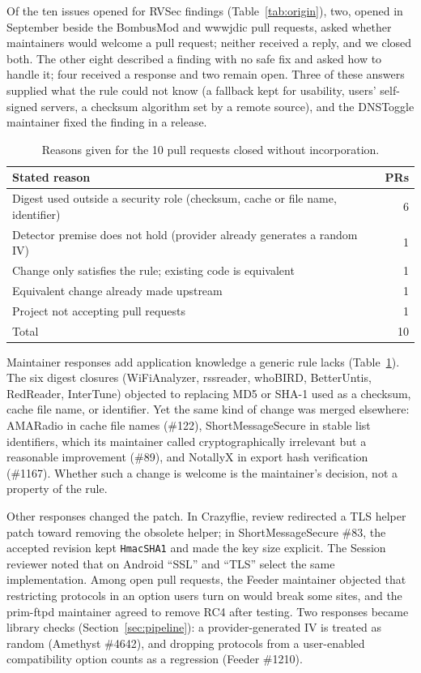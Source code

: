 \documentclass[conference]{IEEEtran}
\begin{document}
Of the ten issues opened for RVSec findings (Table~\ref{tab:origin}), two,
opened in September beside the BombusMod and wwwjdic pull requests, asked whether maintainers would
welcome a pull request; neither received a reply, and we closed both. The other
eight described a finding with no safe fix and asked how to handle it; four
received a response and two remain open. Three of these answers supplied what
the rule could not know (a fallback kept for usability, users' self-signed
servers, a checksum algorithm set by a remote source), and the DNSToggle
maintainer fixed the finding in a release.

\begin{table}[H]
\centering
\caption{Reasons given for the 10 pull requests closed without
incorporation.}
\label{tab:closures}
\footnotesize
\begin{tabular}{p{5.8cm}r}
\toprule
Stated reason & PRs \\
\midrule
Digest used outside a security role (checksum, cache or file name,
identifier) & 6 \\
Detector premise does not hold (provider already generates a random IV) & 1 \\
Change only satisfies the rule; existing code is equivalent & 1 \\
Equivalent change already made upstream & 1 \\
Project not accepting pull requests & 1 \\
\midrule
Total & 10 \\
\bottomrule
\end{tabular}
\end{table}

Maintainer responses add application knowledge a generic rule lacks
(Table~\ref{tab:closures}). The six digest closures (WiFiAnalyzer, rssreader,
whoBIRD, BetterUntis, RedReader, InterTune) objected to replacing MD5 or SHA-1
used as a checksum, cache file name, or identifier. Yet the same kind of
change was merged elsewhere: AMARadio in cache file names (\#122),
ShortMessageSecure in stable list identifiers, which its maintainer called
cryptographically irrelevant but a reasonable improvement (\#89), and NotallyX
in export hash verification (\#1167). Whether such a change is welcome is the
maintainer's decision, not a property of the rule.

Other responses changed the patch. In Crazyflie, review redirected a TLS
helper patch toward removing the obsolete helper; in ShortMessageSecure \#83,
the accepted revision kept \texttt{HmacSHA1} and made the key size explicit.
The Session reviewer noted that on Android ``SSL'' and ``TLS'' select the same
implementation. Among open pull requests, the Feeder maintainer objected
that restricting protocols in an option users turn on would break some sites,
and the prim-ftpd maintainer agreed to remove RC4 after testing. Two responses
became library checks (Section~\ref{sec:pipeline}): a provider-generated IV is treated as random
(Amethyst \#4642), and dropping protocols from a user-enabled compatibility
option counts as a regression (Feeder \#1210).
\end{document}
